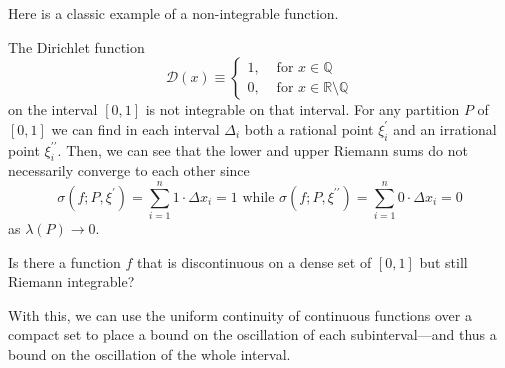   Here is a classic example of a non-integrable function.  

  \begin{example}
    The Dirichlet function
    \begin{equation}
      \mathcal{D}(x) \equiv \begin{cases}
        1, & \text{ for } x \in \mathbb{Q} \\
        0, & \text{ for } x \in \mathbb{R} \setminus \mathbb{Q}
      \end{cases}
    \end{equation}
    on the interval $[0,1]$ is not integrable on that interval. For any partition $P$ of $[0,1]$ we can find in each interval $\Delta_i$ both a rational point $\xi^\prime_i$ and an irrational point $\xi_i^{\prime\prime}$. Then, we can see that the lower and upper Riemann sums do not necessarily converge to each other since
    \begin{equation}
      \sigma(f; P, \xi^\prime) = \sum_{i=1}^n 1 \cdot \Delta x_i = 1 \text{ while } \sigma(f;P, \xi^{\prime\prime}) = \sum_{i=1}^n 0 \cdot \Delta x_i = 0
    \end{equation}
    as $\lambda(P) \rightarrow 0$. 
  \end{example}

  \begin{example}
    Is there a function $f$ that is discontinuous on a dense set of $[0, 1]$ but still Riemann integrable? 
  \end{example}

  With this, we can use the uniform continuity of continuous functions over a compact set to place a bound on the oscillation of each subinterval---and thus a bound on the oscillation of the whole interval. 

